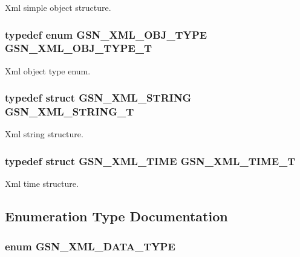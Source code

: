 Xml simple object structure. 

\hypertarget{a00679_gaa26694299ab465dbf5806f74d06aedc9}{
\subsubsection[{GSN\_\-XML\_\-OBJ\_\-TYPE\_\-T}]{\setlength{\rightskip}{0pt plus 5cm}typedef enum {\bf GSN\_\-XML\_\-OBJ\_\-TYPE} {\bf GSN\_\-XML\_\-OBJ\_\-TYPE\_\-T}}}
\label{a00679_gaa26694299ab465dbf5806f74d06aedc9}


Xml object type enum. 

\hypertarget{a00679_ga463f36b04e13c9f42e702c5a53312da8}{
\subsubsection[{GSN\_\-XML\_\-STRING\_\-T}]{\setlength{\rightskip}{0pt plus 5cm}typedef struct {\bf GSN\_\-XML\_\-STRING} {\bf GSN\_\-XML\_\-STRING\_\-T}}}
\label{a00679_ga463f36b04e13c9f42e702c5a53312da8}


Xml string structure. 

\hypertarget{a00679_ga227674b6a3bbe3f3ce354c361344dacc}{
\subsubsection[{GSN\_\-XML\_\-TIME\_\-T}]{\setlength{\rightskip}{0pt plus 5cm}typedef struct {\bf GSN\_\-XML\_\-TIME} {\bf GSN\_\-XML\_\-TIME\_\-T}}}
\label{a00679_ga227674b6a3bbe3f3ce354c361344dacc}


Xml time structure. 



\subsection{Enumeration Type Documentation}
\hypertarget{a00679_ga0ed9af8f445f8406f6a0a2a84e40eb81}{
\subsubsection[{GSN\_\-XML\_\-DATA\_\-TYPE}]{\setlength{\rightskip}{0pt plus 5cm}enum {\bf GSN\_\-XML\_\-DATA\_\-TYPE}}}
\label{a00679_ga0ed9af8f445f8406f6a0a2a84e40eb81}


